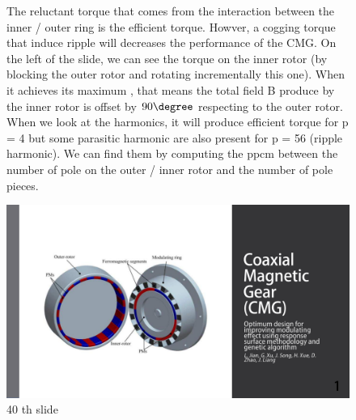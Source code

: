 \begin{figure}[H]
    \begin{minipage}{.45\linewidth}
    The reluctant torque that comes from the interaction between the inner / outer ring is the efficient torque. Howver, a cogging torque that induce ripple will decreases the performance of the CMG.
    On the left of the slide, we can see the torque on the inner rotor (by blocking the outer rotor and rotating incrementally this one). When it achieves its maximum , that means the total field B produce by the inner rotor is offset by $90 \degree$ respecting to the outer rotor. When we look at the harmonics, it will produce efficient torque for p = 4 but some parasitic harmonic are also present for p = 56 (ripple harmonic). We can find them by computing the ppcm between the number of pole on the outer / inner rotor and the number of pole pieces.

 
       
    \end{minipage}
    \hfill%
    \begin{minipage}[c]{.45\linewidth}
        \centering
        \includegraphics[page={40},width=\textwidth]{LELEC2311.allow.pdf}
        \caption{40 th slide}
    \end{minipage}
\end{figure}

